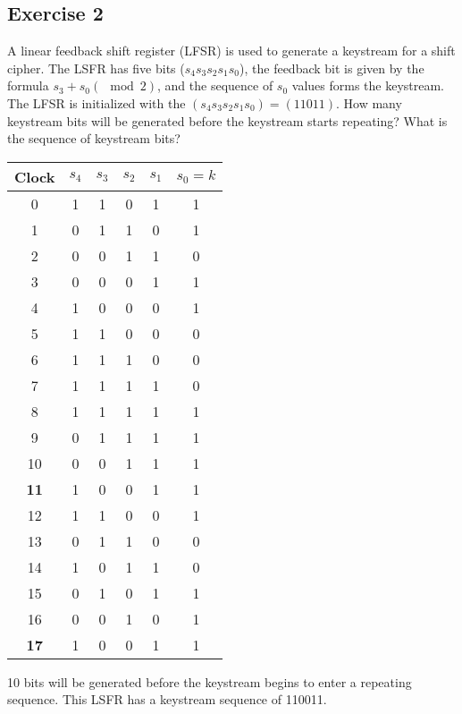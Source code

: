 \documentclass{math}
\begin{document}
\subsection*{Exercise 2}
A linear feedback shift register (LFSR) is used to generate a keystream for a
shift cipher. The LSFR has five bits (\( s_4 s_3 s_2 s_1 s_0 \)), the feedback
bit is given by the formula \( s_3+s_0 (\mod 2) \), and the sequence of
\( s_0 \) values forms the keystream. The LFSR is initialized with the
\( (s_4 s_3 s_2 s_1 s_0) = (1 1 0 1 1) \). How many keystream bits will be
generated before the keystream starts repeating? What is the sequence of
keystream bits?
\begin{center}
  \begin{tabular}{|c|c|c|c|c|c|}
    \hline
    Clock & \( s_4 \) & \( s_3 \) & \( s_2 \) & \( s_1 \) & \( s_0 = k \) \\
    \hline
    0 & 1 & 1 & 0 & 1 & 1 \\
    1 & 0 & 1 & 1 & 0 & 1 \\
    2 & 0 & 0 & 1 & 1 & 0 \\
    3 & 0 & 0 & 0 & 1 & 1 \\
    4 & 1 & 0 & 0 & 0 & 1 \\
    5 & 1 & 1 & 0 & 0 & 0 \\
    6 & 1 & 1 & 1 & 0 & 0 \\
    7 & 1 & 1 & 1 & 1 & 0 \\
    8 & 1 & 1 & 1 & 1 & 1 \\
    9 & 0 & 1 & 1 & 1 & 1 \\
    10 & 0 & 0 & 1 & 1 & 1 \\ \hline
    \textbf{11} & 1 & 0 & 0 & 1 & 1 \\
    12 & 1 & 1 & 0 & 0 & 1 \\
    13 & 0 & 1 & 1 & 0 & 0 \\
    14 & 1 & 0 & 1 & 1 & 0 \\
    15 & 0 & 1 & 0 & 1 & 1 \\
    16 & 0 & 0 & 1 & 0 & 1 \\ \hline
    \textbf{17} & 1 & 0 & 0 & 1 & 1 \\
    \hline
  \end{tabular}
\end{center}
10 bits will be generated before the keystream begins to enter a repeating
sequence. This LSFR has a keystream sequence of 110011.
\end{document}
